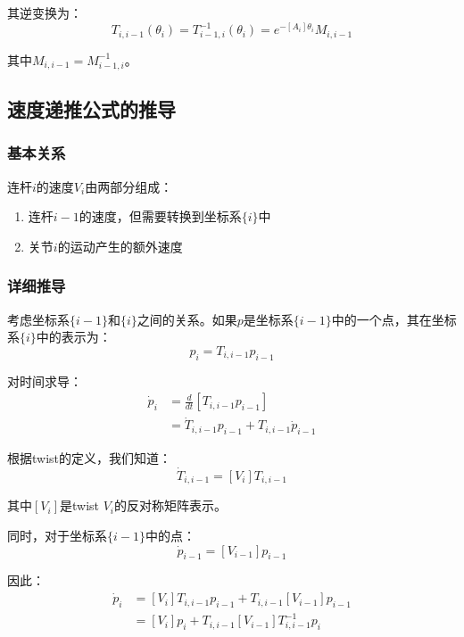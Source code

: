 \documentclass[12pt,a4paper]{article}
\begin{document}
其逆变换为：
\begin{equation}
T_{i,i-1}(\theta_i) = T_{i-1,i}^{-1}(\theta_i) = e^{-[A_i]\theta_i} M_{i,i-1}
\label{eq:pose_inverse}
\end{equation}

其中$M_{i,i-1} = M_{i-1,i}^{-1}$。

\subsection{速度递推公式的推导}

\subsubsection{基本关系}

连杆$i$的速度$V_i$由两部分组成：
\begin{enumerate}
\item 连杆$i-1$的速度，但需要转换到坐标系$\{i\}$中
\item 关节$i$的运动产生的额外速度
\end{enumerate}

\subsubsection{详细推导}

考虑坐标系$\{i-1\}$和$\{i\}$之间的关系。如果$p$是坐标系$\{i-1\}$中的一个点，其在坐标系$\{i\}$中的表示为：
\begin{equation}
p_i = T_{i,i-1} p_{i-1}
\end{equation}

对时间求导：
\begin{align}
\dot{p}_i &= \frac{d}{dt}[T_{i,i-1} p_{i-1}] \\
          &= \dot{T}_{i,i-1} p_{i-1} + T_{i,i-1} \dot{p}_{i-1}
\end{align}

根据twist的定义，我们知道：
\begin{equation}
\dot{T}_{i,i-1} = [V_i] T_{i,i-1}
\end{equation}

其中$[V_i]$是twist $V_i$的反对称矩阵表示。

同时，对于坐标系$\{i-1\}$中的点：
\begin{equation}
\dot{p}_{i-1} = [V_{i-1}] p_{i-1}
\end{equation}

因此：
\begin{align}
\dot{p}_i &= [V_i] T_{i,i-1} p_{i-1} + T_{i,i-1} [V_{i-1}] p_{i-1} \\
          &= [V_i] p_i + T_{i,i-1} [V_{i-1}] T_{i,i-1}^{-1} p_i
\end{align}
\end{document}
